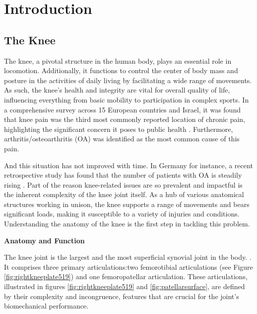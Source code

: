 \documentclass{micro-econ-thesis}
\begin{document}

\cleardoublepage
\pagestyle{headings}
\setcounter{page}{1}
\onehalfspacing %


\section{Introduction}
\label{sec:intro}


\subsection{The Knee }
The knee, a pivotal structure in the human body, plays an essential role in locomotion. Additionally, it functions to control the center of body mass and posture in the activities of daily living by facilitating a wide range of movements. As such, the knee's health and integrity are vital for overall quality of life, influencing everything from basic mobility to participation in complex sports. In a comprehensive survey across 15 European countries and Israel, it was found that knee pain was the third most commonly reported location of chronic pain, highlighting the significant concern it poses to public health \parencite{breivik_survey_2006}. Furthermore, arthritis/osteoarthritis (OA) was identified as the most common cause of this pain. 

And this situation has not improved with time. In Germany for instance, a recent retrospective study has found that the number of patients with OA is steadily rising \parencite{obermuller_epidemiology_2024}. 
Part of the reason knee-related issues are so prevalent and impactful is the inherent complexity of the knee joint itself. As a hub of various anatomical structures working in unison, the knee supports a range of movements and bears significant loads, making it susceptible to a variety of injuries and conditions.
Understanding the anatomy of the knee is the first step in tackling this problem. 

\textbf{Anatomy and Function}

The knee joint is the largest and the most superficial synovial joint in the body. \parencite{dalley_moores_2023}. 
It comprises three primary articulations:two femorotibial articulations (see Figure \ref{fig:rightkneeplate519}) and one femoropatellar articulation. These articulations, illustrated in figures \ref{fig:rightkneeplate519} and \ref{fig:patellarsurface}, are defined by their complexity and incongruence, features that are crucial for the joint's biomechanical performance. 
 
\end{document}

